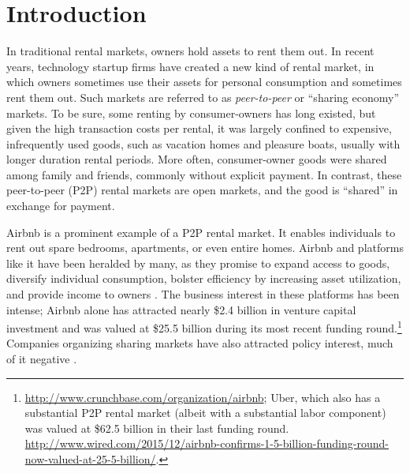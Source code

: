 \documentclass[12pt]{article}
\begin{document}
\section{Introduction}
In traditional rental markets, owners hold assets to rent them out.
In recent years, technology startup firms have created a new kind of rental market, in which owners sometimes use their assets for personal consumption and sometimes rent them out.
Such markets are referred to as \emph{peer-to-peer} or ``sharing economy'' markets.  
To be sure, some renting by consumer-owners has long existed, but
given the high transaction costs per rental, it was largely confined to expensive, infrequently used goods, such as vacation homes and pleasure boats, usually with longer duration rental periods.
More often, consumer-owner goods were shared among family and friends, commonly without explicit payment.
In contrast, these peer-to-peer (P2P) rental markets are open markets, and the good is ``shared'' in exchange for payment. 

Airbnb is a prominent example of a P2P rental market. 
It enables individuals to rent out spare bedrooms, apartments, or even entire homes. 
Airbnb and platforms like it have been heralded by many, as they promise to expand access to goods, diversify individual consumption, bolster efficiency by increasing asset utilization, and provide income to owners \citep{sundararajan2013zipcar,sundararajan2016, edelman2015efficiencies, botsman2010s}.
The business interest in these platforms has been intense; Airbnb alone has attracted nearly \$2.4 billion in venture capital investment and was valued at \$25.5 billion during its most recent funding round.\footnote{\href{http://www.crunchbase.com/organization/airbnb}{http://www.crunchbase.com/organization/airbnb};
  Uber, which also has a substantial P2P rental market (albeit with a substantial labor component) was valued at \$62.5 billion in their last funding round. 
  \href{http://www.wired.com/2015/12/airbnb-confirms-1-5-billion-funding-round-now-valued-at-25-5-billion/}{http://www.wired.com/2015/12/airbnb-confirms-1-5-billion-funding-round-now-valued-at-25-5-billion/}. 
}
Companies organizing sharing markets have also attracted policy interest, much of it negative \citep{slee2015, malhotra2014dark, avital2015}.
\end{document}
